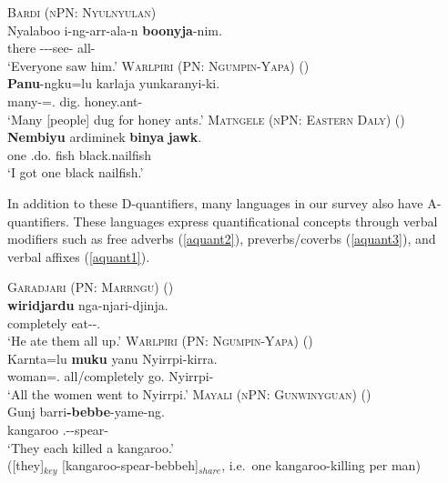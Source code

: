 \documentclass[12pt,egregdoesnotlikesansseriftitles]{scrartcl}
\begin{document}
\begin{exe}
  \ex\label{allerg} \textsc{Bardi (nPN: Nyulnyulan)}\hfill {}\\
  \gll Nyalaboo i-ng-arr-ala-n \textbf{boonyja}-nim.\\
  there \Third-\Pst-\Aug-see-\Rempst{} all-\Erg\\
  \glt `Everyone saw him.'
  \ex \textsc{Warlpiri (PN: Ngumpin-Yapa)} \hfill(\citealt[6]{bowler17})\\
  \gll \textbf{Panu}-ngku=lu karlaja yunkaranyi-ki.\\
  many-\Erg=\Tpl.\Sarg{} dig.\Pst{} honey.ant-\Dat\\
  \glt `Many [people] dug for honey ants.' \label{agrmarking1}
  \ex \textsc{Matngele (nPN: Eastern Daly)} \hfill(\citealt[54]{zandvoort99})\\
  \gll \textbf{Nembiyu} ardiminek \textbf{binya} \textbf{jawk}.\\
  one \First\Min\Sarg.do.\Pst{} fish black.nailfish\\
  \glt `I got one black nailfish.'  \label{discconst}
\end{exe}


In addition to these D-quantifiers, many languages in our survey also have A-quantifiers. These languages express quantificational concepts through verbal modifiers such as free adverbs (\ref{aquant2}), preverbs/coverbs (\ref{aquant3}), and verbal affixes (\ref{aquant1}).
\begin{exe}
  \ex\textsc{Garadjari (PN: Marrngu)} \hfill(\citealt[54]{sands89})\\
  \gll \textbf{wiridjardu}  nga-njari-djinja.\\
  completely  eat-\Cont{}-\Tpl.\Parg\\
  \glt `He ate them all up.' \label{aquant2}
  \ex \textsc{Warlpiri (PN: Ngumpin-Yapa)} \hfill (\citealt[15]{bowler17})\\
  \gll Karnta=lu \textbf{muku} yanu Nyirrpi-kirra.\\
  woman=\Tpl.\Sarg{} all/completely go.\Pst{} Nyirrpi-\All\\
  `All the women went to Nyirrpi.' \label{aquant3}
  \ex \textsc{Mayali (nPN: Gunwinyguan)} \hfill(\citealt[221]{evans95})\\
  \gll Gunj barri\textbf{-bebbe}-yame-ng.\\
  kangaroo \Third.\Aug-\Distr-spear-\Pp\\
  \glt `They each killed a kangaroo.'\\
  ([they]$_{key}$ [kangaroo-spear-bebbeh]$_{share}$, i.e.\ one kangaroo-killing per man) \label{aquant1}
\end{exe}
\end{document}
